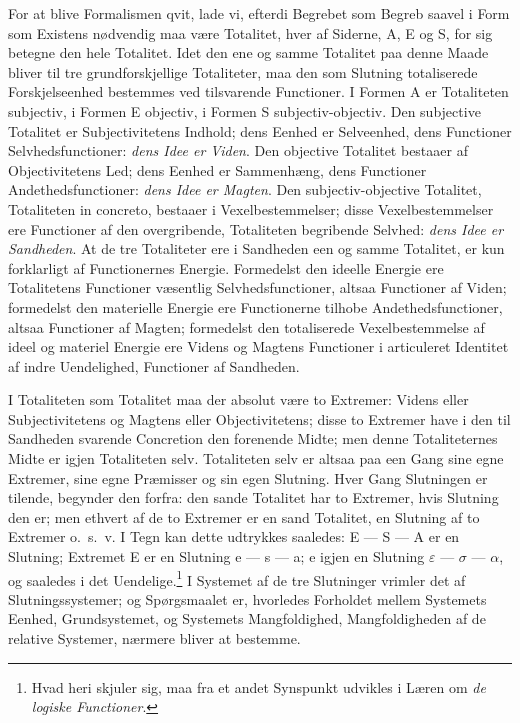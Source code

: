 \documentclass[12pt]{book}
\newcommand{\opage}[1]{\marginnote{\footnotesize\textit{[#1]}}}
\begin{document}
For at blive Formalismen qvit, lade vi, efterdi Begrebet som Begreb saavel i Form som Existens
nødvendig maa være Totalitet, hver af Siderne, A, E og S, for sig betegne den hele Totalitet. Idet
den ene og samme Totalitet paa denne Maade bliver til tre grundforskjellige Totaliteter, maa den som
Slutning totaliserede Forskjelseenhed bestemmes ved tilsvarende Functioner. I Formen A er Totaliteten
subjectiv, i Formen E objectiv, i Formen S subjectiv-objectiv. Den subjective Totalitet er
Subjectivitetens Indhold; dens Eenhed er Selveenhed, dens Functioner Selvhedsfunctioner: \emph{dens
Idee er Viden}. Den objective Totalitet bestaaer af Objectivitetens Led; dens Eenhed er Sammenhæng,
dens Functioner Andethedsfunctioner: \emph{dens Idee er Magten}. Den subjectiv-objective Totalitet,
Totaliteten in concreto, bestaaer i
\opage{433} Vexelbestemmelser; disse Vexelbestemmelser ere Functioner af den overgribende, Totaliteten begribende
Selvhed: \emph{dens Idee er Sandheden}. At de tre Totaliteter ere i Sandheden een og samme Totalitet,
er kun forklarligt af Functionernes Energie. Formedelst den ideelle Energie ere Totalitetens
Functioner væsentlig Selvhedsfunctioner, altsaa Functioner af Viden; formedelst den materielle Energie
ere Functionerne tilhobe Andethedsfunctioner, altsaa Functioner af Magten; formedelst den totaliserede
Vexelbestemmelse af ideel og materiel Energie ere Videns og Magtens Functioner i articuleret Identitet
af indre Uendelighed, Functioner af Sandheden.

I Totaliteten som Totalitet maa der absolut være to Extremer: Videns eller Subjectivitetens og
Magtens eller Objectivitetens; disse to Extremer have i den til Sandheden svarende Concretion den
forenende Midte; men denne Totaliteternes Midte er igjen Totaliteten selv. Totaliteten selv er altsaa
paa een Gang sine egne Extremer, sine egne Præmisser og sin egen Slutning. Hver Gang Slutningen er
tilende, begynder den forfra: den sande Totalitet har to Extremer, hvis Slutning den er; men ethvert
af de to Extremer er en sand Totalitet, en Slutning af to Extremer o.\ s.\ v. I Tegn kan dette
udtrykkes saaledes: E — S — A er en Slutning; Extremet E er en Slutning e — s — a; e igjen en
Slutning $\varepsilon$ — $\sigma$ — $\alpha$, og saaledes i det Uendelige.\footnote{Hvad heri skjuler
sig, maa fra et andet Synspunkt udvikles i Læren om \emph{de logiske Functioner}.} I Systemet af de
tre Slutninger vrimler det af Slutningssystemer; og Spørgsmaalet er, hvorledes Forholdet mellem
Systemets Eenhed, Grundsystemet, og Systemets Mangfoldighed, Mangfoldigheden af de relative Systemer,
nærmere bliver at bestemme.
\end{document}
